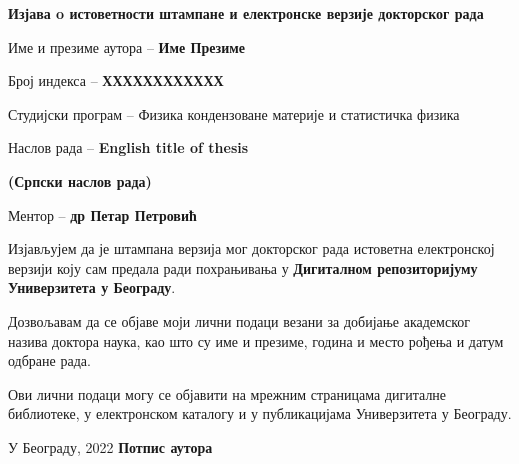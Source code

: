 \cleardoublepage

\thispagestyle{empty}
\setlength{\parindent}{0pt}
\renewcommand{\headrulewidth}{0pt}


\normalsize

\mbox{}
\vspace{1cm}

\begin{center}


\begin{Large}\textbf{Изјава o истоветности штампане и електронске верзије 
докторског рада 
}
\end{Large} 
\end{center}


\vspace{1cm}

Име и презиме аутора -- \textbf{Име Презиме}

Број индекса -- \textbf{ХХХХХХХХХХХХ}

Студијски програм --  Физика кондензоване материје и статистичка физика

Наслов рада -- 
{
\textbf{English title of thesis}}

\textbf{(Српски наслов рада)}

Ментор -- \textbf{др Петар Петровић}

Изјављујем  да  је  штампана  верзија  мог  докторског  рада  истоветна  
електронској верзији  коју  сам  предала  ради  похрањивања у \textbf{Дигиталном 
репозиторијуму Универзитета у Београду}. 

Дозвољавам да се објаве моји лични 
подаци везани за добијање академског назива доктора наука, као што су име и 
презиме, година и место рођења и датум одбране рада. 

Ови лични подаци могу се 
објавити на мрежним страницама дигиталне библиотеке, у електронском каталогу и 
у 
публикацијама Универзитета у Београду.
 

\vfill

У Београду, \hspace{1cm} 2022  \hfill  \textbf{Потпис
аутора\hspace{2cm}\mbox{}}

\vspace{.5cm}
\hspace{10cm}\hrulefill 


\hspace{\fill}
\pagebreak
\justify

